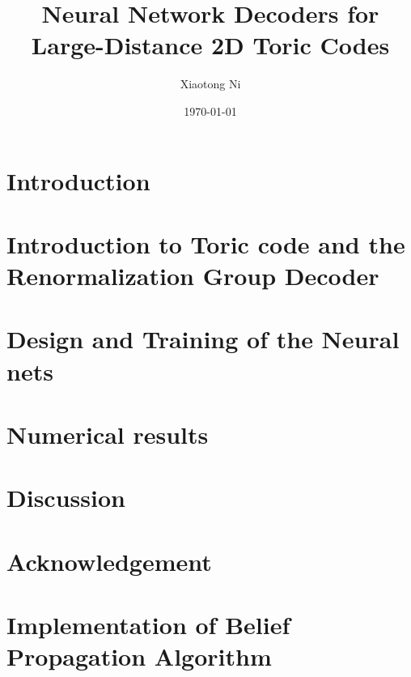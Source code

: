 \documentclass[twocolumn, nofootinbib]{revtex4-1}
\begin{document}
	
\title{Neural Network Decoders for Large-Distance 2D Toric Codes}

\author{Xiaotong Ni}


\date{\today}

\maketitle




\section{Introduction}
\label{sec:Intro}


\section{Introduction to Toric code and the Renormalization Group Decoder}
\label{sec:toric_code_and_rn_decoder}


\section{Design and Training of the Neural nets}
\label{sec:design}


\section{Numerical results}
\label{sec:numerics}


\section{Discussion}
\label{sec:discussion}


\section{Acknowledgement}
\label{sec:acknowledgement}





\appendix


\section{Implementation of Belief Propagation Algorithm}
\label{appendix:bp}

\end{document}
